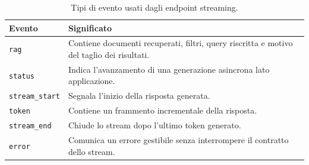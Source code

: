 \begin{table}[ht]
  \centering
  \caption{Tipi di evento usati dagli endpoint streaming.}
  \label{tab:ndjson_event_conventions}
  \small
  \begin{tabularx}{\textwidth}{L{3.5cm}Y}
    \toprule
    \textbf{Evento} & \textbf{Significato} \\
    \midrule
    \texttt{rag}
      & Contiene documenti recuperati, filtri, query riscritta e motivo del
        taglio dei risultati. \\
    \texttt{status}
      & Indica l'avanzamento di una generazione asincrona lato applicazione. \\
    \texttt{stream\_start}
      & Segnala l'inizio della risposta generata. \\
    \texttt{token}
      & Contiene un frammento incrementale della risposta. \\
    \texttt{stream\_end}
      & Chiude lo stream dopo l'ultimo token generato. \\
    \texttt{error}
      & Comunica un errore gestibile senza interrompere il contratto dello
        stream. \\
    \bottomrule
  \end{tabularx}
\end{table}
